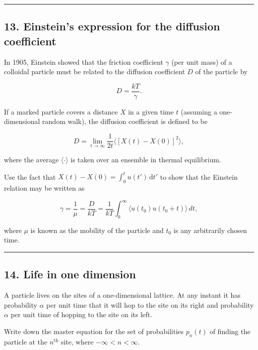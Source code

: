 \documentclass[
  letterpaper,
  enabledeprecatedfontcommands]{report}
\begin{document}
\begin{center}\rule{0.5\linewidth}{0.5pt}\end{center}

\subsection*{13. Einstein's expression for the diffusion
coefficient}\label{einsteins-expression-for-the-diffusion-coefficient}

In 1905, Einstein showed that the friction coefficient \(\gamma\) (per
unit mass) of a colloidal particle must be related to the diffusion
coefficient \(D\) of the particle by

\[
D = \frac{kT}{\gamma}.
\]

If a marked particle covers a distance \(X\) in a given time \(t\)
(assuming a one-dimensional random walk), the diffusion coefficient is
defined to be

\[
D = \lim_{t \to \infty} \frac{1}{2t} \langle [X(t) - X(0)]^2 \rangle,
\]

where the average \(\langle \cdot \rangle\) is taken over an ensemble in
thermal equilibrium.

Use the fact that \(X(t) - X(0)
= \int_{0}^{t} u(t')\,\mathrm{d}t'\) to show that the Einstein relation
may be written as

\[
\gamma = \frac{1}{\mu} = \frac{D}{kT} = \frac{1}{kT} \int_0^\infty \langle u(t_0) u(t_0 + t) \rangle \, dt,
\]

where \(\mu\) is known as the mobility of the particle and \(t_0\) is
any arbitrarily chosen time.

\begin{center}\rule{0.5\linewidth}{0.5pt}\end{center}

\subsection*{14. Life in one dimension}\label{life-in-one-dimension}

A particle lives on the sites of a one-dimensional lattice. At any
instant it has probability \(\alpha\) per unit time that it will hop to
the site on its right and probability \(\alpha\) per unit time of
hopping to the site on its left.

Write down the master equation for the set of probabilities \(p_n(t)\)
of finding the particle at the \(n^{\text{th}}\) site, where
\(-\infty < n < \infty\).
\end{document}
